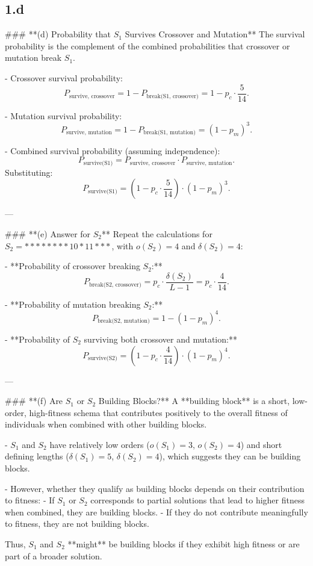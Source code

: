 \documentclass[12pt,letterpaper]{article}
\begin{document}
\subsection*{1.d}
### **(d) Probability that \( S_1 \) Survives Crossover and Mutation**
The survival probability is the complement of the combined probabilities that crossover or mutation break \( S_1 \).

- Crossover survival probability:
    \[
    P_{\text{survive, crossover}} = 1 - P_{\text{break(S1, crossover)}} = 1 - p_c \cdot \frac{5}{14}.
    \]

- Mutation survival probability:
    \[
    P_{\text{survive, mutation}} = 1 - P_{\text{break(S1, mutation)}} = (1 - p_m)^3.
    \]

- Combined survival probability (assuming independence):
    \[
    P_{\text{survive(S1)}} = P_{\text{survive, crossover}} \cdot P_{\text{survive, mutation}}.
    \]
    Substituting:
    \[
    P_{\text{survive(S1)}} = \left( 1 - p_c \cdot \frac{5}{14} \right) \cdot (1 - p_m)^3.
    \]

---

### **(e) Answer for \( S_2 \)**
Repeat the calculations for \( S_2 = ********10*11*** \), with \( o(S_2) = 4 \) and \( \delta(S_2) = 4 \):

- **Probability of crossover breaking \( S_2 \):**
    \[
    P_{\text{break(S2, crossover)}} = p_c \cdot \frac{\delta(S_2)}{L - 1} = p_c \cdot \frac{4}{14}.
    \]

- **Probability of mutation breaking \( S_2 \):**
    \[
    P_{\text{break(S2, mutation)}} = 1 - (1 - p_m)^4.
    \]

- **Probability of \( S_2 \) surviving both crossover and mutation:**
    \[
    P_{\text{survive(S2)}} = \left( 1 - p_c \cdot \frac{4}{14} \right) \cdot (1 - p_m)^4.
    \]

---

### **(f) Are \( S_1 \) or \( S_2 \) Building Blocks?**
A **building block** is a short, low-order, high-fitness schema that contributes positively to the overall fitness of individuals when combined with other building blocks.

- \( S_1 \) and \( S_2 \) have relatively low orders (\( o(S_1) = 3 \), \( o(S_2) = 4 \)) and short defining lengths (\( \delta(S_1) = 5 \), \( \delta(S_2) = 4 \)), which suggests they can be building blocks.

- However, whether they qualify as building blocks depends on their contribution to fitness:
    - If \( S_1 \) or \( S_2 \) corresponds to partial solutions that lead to higher fitness when combined, they are building blocks.
    - If they do not contribute meaningfully to fitness, they are not building blocks.

Thus, \( S_1 \) and \( S_2 \) **might** be building blocks if they exhibit high fitness or are part of a broader solution.
\end{document}
